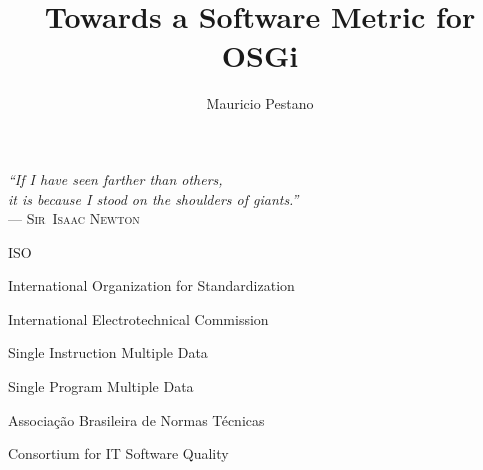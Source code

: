 \documentclass[cic,tc,english]{iiufrgs} %
\title{Towards a Software Metric for OSGi}
\author{Mauricio Pestano}{Rafael}
\begin{document}
\maketitle
\clearpage
\begin{flushright}
\mbox{}\vfill
{\sffamily\itshape
``If I have seen farther than others,\\
it is because I stood on the shoulders of giants.''\\}
--- \textsc{Sir~Isaac Newton}
\end{flushright}





\tableofcontents





\listoffigures

\listoftables

\begin{listofabbrv}{ISO}
        \item[ISO] International Organization for Standardization
        \item[IEC] International Electrotechnical Commission
        \item[SIMD] Single Instruction Multiple Data
        \item[SPMD] Single Program Multiple Data
        \item[ABNT] Associação Brasileira de Normas Técnicas
        \item[CISQ] Consortium for IT Software Quality 
\end{listofabbrv}





 
\end{document}
